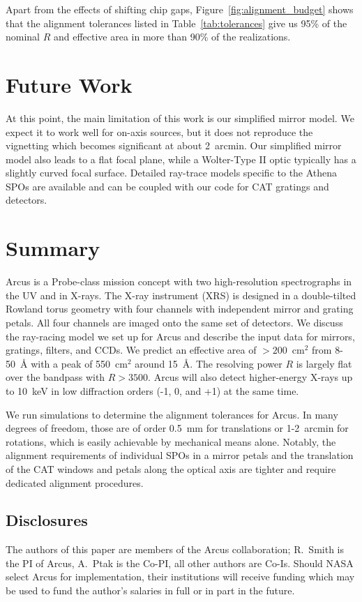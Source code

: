 \documentclass[12pt]{spieman}  %
\begin{document}
\begin{spacing}{1}
Apart from the effects of shifting chip gaps, Figure~\ref{fig:alignment_budget} shows that the alignment tolerances listed in Table~\ref{tab:tolerances} give us 95\% of the nominal $R$ and effective area in more than 90\% of the realizations.

\section{Future Work}
At this point, the main limitation of this work is our simplified mirror model. We expect it to work well for on-axis sources, but it does not reproduce the vignetting which becomes significant at about 2~arcmin. Our simplified mirror model also leads to a flat focal plane, while a Wolter-Type II optic typically has a slightly curved focal surface. Detailed ray-trace models specific to the Athena SPOs are available\cite{10.1117/12.2232230,10.1117/12.2594461,10.1117/12.2628133} and can be coupled with our code for CAT gratings and detectors.

\section{Summary}
\label{sect:summary}
Arcus is a Probe-class mission concept with two high-resolution spectrographs in the UV and in X-rays. The X-ray instrument (XRS) is designed in a double-tilted Rowland torus geometry with four channels with independent mirror and grating petals. All four channels are imaged onto the same set of detectors. We discuss the ray-racing model we set up for Arcus and describe the input data for mirrors, gratings, filters, and CCDs. We predict an effective area of $>200$~cm$^2$ from 8-50~\AA{} with a peak of 550~cm$^2$ around 15~\AA{}. The resolving power $R$ is largely flat over the bandpass with $R>3500$. Arcus will also detect higher-energy X-rays up to 10~keV in low diffraction orders (-1, 0, and +1) at the same time.

We run simulations to determine the alignment tolerances for Arcus. In many degrees of freedom, those are of order 0.5~mm for translations or 1-2~arcmin for rotations, which is easily achievable by mechanical means alone. Notably, the alignment requirements of individual SPOs in a mirror petals  and the translation of the CAT windows and petals along the optical axis are tighter and require dedicated alignment procedures.






\subsection*{Disclosures}
The authors of this paper are members of the Arcus collaboration; R.~Smith is the PI of Arcus, A.~Ptak is the Co-PI, all other authors are Co-Is. Should NASA select Arcus for implementation, their institutions will receive funding which may be used to fund the author's salaries in full or in part in the future.



\end{spacing}
\end{document}
